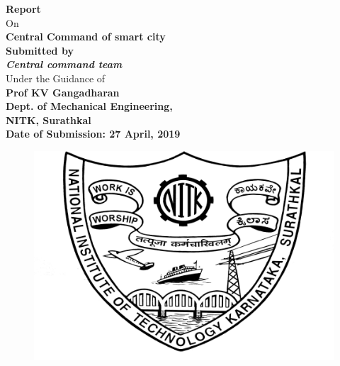 \documentclass{article}[12pt,a4paper]
\begin{document}
\begin{titlepage}

    \centering
    \vspace{-3em}
    {\Large\textbf{Report}}\\
    \vspace{1.5em}
    On\\
    \vspace{1.5em}
    {\Huge \textbf{Central Command of smart city}}\\
    \vspace{3em}
    {\LARGE \bfseries Submitted by}\\
    \vspace{2em}
    {\Large \emph{\textbf{Central command team}}}\\
    \vspace{4em}
    {\Large Under the Guidance of}\\
    \vspace{2em}
    {\Large \textbf{Prof KV Gangadharan}}\\
    \vspace{2em}
    {\Large \textbf{Dept. of Mechanical Engineering,}}\\
    \vspace{2em}
    {\Large \textbf{NITK, Surathkal}}\\
    \vspace{4em}
    {\Large \textbf{Date of Submission: 27 April, 2019}}\\
    \vspace{1.5em}
    \begin{figure}[!ht]
        \centering
        \includegraphics{nitk-logo.png}

\end{figure}
\end{titlepage}
\end{document}
